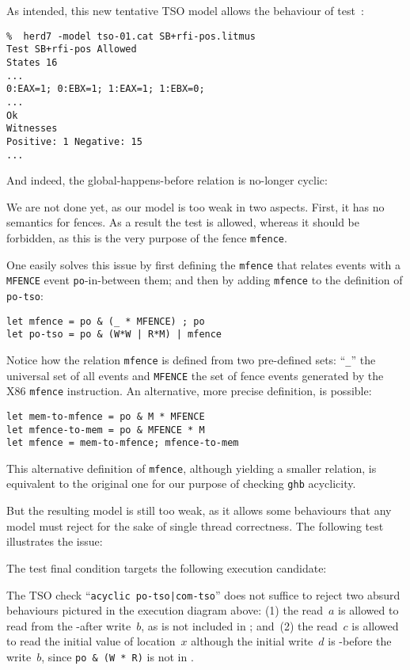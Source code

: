 As intended, this new tentative TSO model allows the behaviour of test~:
\begin{verbatim}
%  herd7 -model tso-01.cat SB+rfi-pos.litmus
Test SB+rfi-pos Allowed
States 16
...
0:EAX=1; 0:EBX=1; 1:EAX=1; 1:EBX=0;
...
Ok
Witnesses
Positive: 1 Negative: 15
...
\end{verbatim}
And indeed, the global-happens-before relation is no-longer cyclic:
\begin{center}\end{center}


We are not done yet, as our model is too weak in two aspects.
First, it has no semantics for fences.
As a result the test  is allowed, whereas it should
be forbidden, as this is the very purpose of the fence \texttt{mfence}.
\begin{center}\end{center}
One easily solves this issue by first defining the \verb+mfence+
that relates events with a \verb+MFENCE+ event \texttt{po}-in-between them;
and then by adding \verb+mfence+ to the definition of \verb+po-tso+:
\begin{verbatim}
let mfence = po & (_ * MFENCE) ; po
let po-tso = po & (W*W | R*M) | mfence
\end{verbatim}
Notice how the relation \verb+mfence+ is defined from two pre-defined sets:
``\verb+_+'' the universal set of all events and \verb+MFENCE+ the set
of fence events generated by the X86 \texttt{mfence} instruction.
An alternative, more precise definition, is possible:
\begin{verbatim}
let mem-to-mfence = po & M * MFENCE
let mfence-to-mem = po & MFENCE * M
let mfence = mem-to-mfence; mfence-to-mem
\end{verbatim}
This alternative definition of \texttt{mfence},
although yielding a smaller relation, is equivalent to the original one
for our purpose of checking \texttt{ghb} acyclicity.

But the resulting model is still too weak,
as it allows some behaviours that any model must
reject for the sake of single thread correctness.
The following test  illustrates the issue:

The test final condition targets the following execution candidate:
\begin{center}\end{center}
The TSO check ``\verb+acyclic po-tso|com-tso+'' does not suffice to reject
two absurd behaviours pictured in the execution diagram above:
(1) the read~$a$ is allowed to
read from the -after write~$b$, as  is not included
in ; and~(2)
the read~$c$ is allowed to read the initial value of location~$x$
although the initial write~$d$ is -before the write~$b$,
since \verb+po & (W * R)+ is not in .

